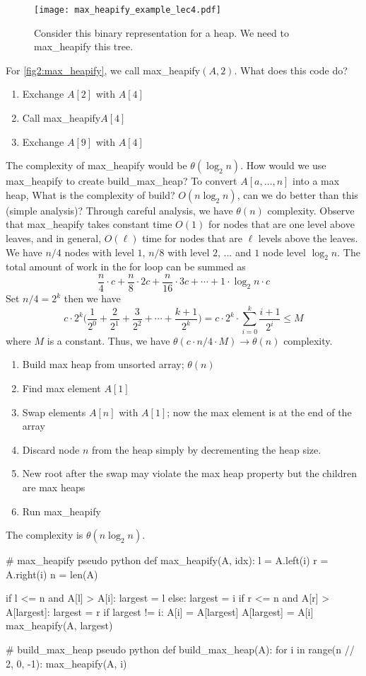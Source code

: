 \begin{figure}[h]
	\centering
	\texttt{[image: max\_heapify\_example\_lec4.pdf]}
	\caption{Consider this binary representation for a heap. We need to max\_heapify this tree.}
	\label{fig4:max_heapify}
\end{figure}
For \cref{fig2:max_heapify}, we call max\_heapify\((A, 2)\). What does this code do?
\begin{enumerate}[label=$\ast$]
	\item Exchange \(A[2]\) with \(A[4]\)
	\item Call max\_heapify\(A[4]\)
	\item Exchange \(A[9]\) with \(A[4]\)
\end{enumerate}
The complexity of max\_heapify would be \(\theta(\log_2 n)\). How would we use max\_heapify to 
create build\_max\_heap? To convert \(A[a,\ldots, n]\) into a max heap, What is the complexity of build?
\(O(n\log_2 n)\), can we do better than this (simple analysis)?
Through careful analysis, we have \(\theta(n)\) complexity. Observe that max\_heapify takes constant
time \(O(1)\) for nodes that are one level above leaves, and in general, \(O(\ell)\) time for nodes that
are \(\ell\) levels above the leaves. We have \(n / 4\) nodes with level \(1\), \(n / 8\) with level \(2\), ... and
\(1\) node level \(\log_2 n\). The total amount of work in the for loop can be summed as
\[
	\frac{n}{4}\cdot c + \frac{n}{8}\cdot 2c + \frac{n}{16}\cdot 3c + \cdots + 1\cdot\log_2 n\cdot c
\]
Set \(n / 4 = 2^k\) then we have 
\[
	c\cdot 2^k \Big(\frac{1}{2^0} + \frac{2}{2^1} + \frac{3}{2^2} + \cdots + \frac{k + 1}{2^k}\Big)
	= c\cdot 2^k\cdot\sum_{i = 0}^k\frac{i + 1}{2^i}\leq M
\]
where \(M\) is a constant. Thus, we have \(\theta(c\cdot n /4 \cdot M) \rightarrow \theta(n)\) complexity.
\begin{enumerate}
	\item Build max heap from unsorted array; \(\theta(n)\)
	\item Find max element \(A[1]\)
	\item Swap elements \(A[n]\) with \(A[1]\); now the max element is at the end of the array
	\item Discard node \(n\) from the heap simply by decrementing the heap size.
	\item New root after the swap may violate the max heap property but the children are max heaps
	\item Run max\_heapify
\end{enumerate}
The complexity is \(\theta(n\log_2 n)\).
\begin{python}
# max_heapify pseudo python
def max_heapify(A, idx):
    l = A.left(i)
    r = A.right(i)
    n = len(A)
    
    if l <= n and A[l] > A[i]:
        largest = l
    else:
        largest = i
    if r <= n and A[r] > A[largest]:
        largest = r
    if largest != i:
        A[i] = A[largest]
        A[largest] = A[i]
        max_heapify(A, largest)
        
        
# build_max_heap pseudo python
def build_max_heap(A):
    for i in range(n // 2, 0, -1):
        max_heapify(A, i)
\end{python}

